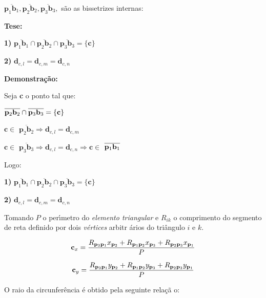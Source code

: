 \documentclass[12pt,a4paper]{book}
\begin{document}
$\overline{\mathbf{p}_{1}\mathbf{b}_{1}},\overline{\mathbf{p}_{2}\mathbf{b}%
_{2}},\overline{\mathbf{p}_{3}\mathbf{b}_{3}},$ s\~{a}o as bissetrizes
internas:

\textbf{Tese:}

\textbf{1) }$\overline{\mathbf{p}_{1}\mathbf{b}_{1}}\cap \overline{\mathbf{p}%
_{2}\mathbf{b}_{2}}\cap \overline{\mathbf{p}_{3}\mathbf{b}_{3}}=\{\mathbf{c\}%
}$

\textbf{2) }$\mathbf{d}_{c,l}=\mathbf{d}_{c,m}=\mathbf{d}_{c,n}$

\textbf{Demonstra\c{c}\~{a}o:}

Seja \textbf{c }o ponto tal que:

$\overline{\mathbf{p}_{2}\mathbf{b}_{2}}\cap \overline{\mathbf{p}_{3}\mathbf{%
b}_{3}}=\{\mathbf{c}\}$

$\mathbf{c\in }$ $\overline{\mathbf{p}_{2}\mathbf{b}_{2}}\Longrightarrow 
\mathbf{d}_{c,l}=\mathbf{d}_{c,m}$

$\mathbf{c\in }$ $\overline{\mathbf{p}_{3}\mathbf{b}_{3}}\Longrightarrow 
\mathbf{d}_{c,l}=\mathbf{d}_{c,n}\Longrightarrow \mathbf{c\in }$ $\overline{%
\mathbf{p}_{1}\mathbf{b}_{1}}$

Logo:

\textbf{1) }$\overline{\mathbf{p}_{1}\mathbf{b}_{1}}\cap \overline{\mathbf{p}%
_{2}\mathbf{b}_{2}}\cap \overline{\mathbf{p}_{3}\mathbf{b}_{3}}=\{\mathbf{c\}%
}$

\textbf{2) }$\mathbf{d}_{c,l}=\mathbf{d}_{c,m}=\mathbf{d}_{c,n}$




Tomando $P$ o per\'{\i}metro do \textit{elemento triangular} e $R_{ik}$ o
comprimento do segmento de reta definido por dois \textit{v\'{e}rtices} arbitr%
\'{a}rios do tri\^{a}ngulo $i$ e $k$.

\begin{equation}
\mathbf{c}_{x}=\frac{R_{\mathbf{p}_{3}\mathbf{p}_{1}}x_{\mathbf{p}_{2}}+R_{%
\mathbf{p}_{1}\mathbf{p}_{2}}x_{\mathbf{p}_{3}}+R_{\mathbf{p}_{2}\mathbf{p}%
_{3}}x_{\mathbf{p}_{1}}}{P}
\end{equation}

\begin{equation}
\mathbf{c}_{y}=\frac{R_{\mathbf{p}_{3}\mathbf{p}_{1}}y_{\mathbf{p}_{2}}+R_{%
\mathbf{p}_{1}\mathbf{p}_{2}}y_{\mathbf{p}_{3}}+R_{\mathbf{p}_{2}\mathbf{p}%
_{3}}y_{\mathbf{p}_{1}}}{P}
\end{equation}%


O raio da circunfer\^{e}ncia \'{e} obtido pela seguinte rela\c{c}\~{a}%
o:
\end{document}
